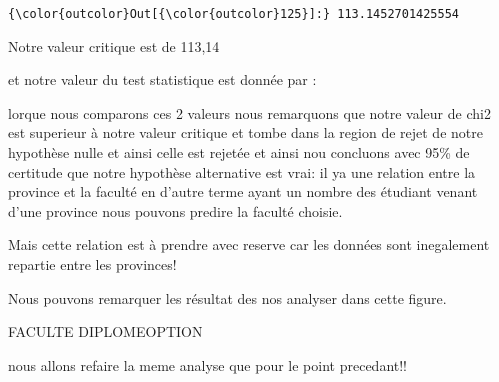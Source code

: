 \documentclass[11pt]{article}
\begin{document}
            \begin{Verbatim}[commandchars=\\\{\}]
{\color{outcolor}Out[{\color{outcolor}125}]:} 113.1452701425554
\end{Verbatim}
        
    Notre valeur critique est de 113,14

    et notre valeur du test statistique est donnée par :

    lorque nous comparons ces 2 valeurs nous remarquons que notre valeur de
chi2 est superieur à notre valeur critique et tombe dans la region de
rejet de notre hypothèse nulle et ainsi celle est rejetée et ainsi nou
concluons avec 95\% de certitude que notre hypothèse alternative est
vrai: il ya une relation entre la province et la faculté en d'autre
terme ayant un nombre des étudiant venant d'une province nous pouvons
predire la faculté choisie.

    Mais cette relation est à prendre avec reserve car les données sont
inegalement repartie entre les provinces!

    Nous pouvons remarquer les résultat des nos analyser dans cette figure.

    FACULTE DIPLOMEOPTION

    nous allons refaire la meme analyse que pour le point precedant!!
\end{document}
